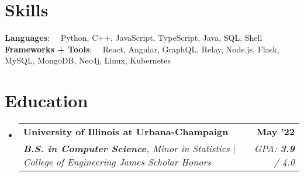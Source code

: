 \documentclass[letterpaper,11pt]{article}
\makeatletter
\newcommand{\resumeItem}[1]{
  \item\small{
    {#1 \vspace{-1pt}}
  }
}
\newcommand{\resumeSubheading}[4]{
  \vspace{-0pt}
  \item
    \begin{tabular*}{1\textwidth}[t]{l@{\extracolsep{\fill}}r}
      \large{\textbf{#1}} & \small{\color{main}\textbf{#2}} \\
      \textit{\small#3} & \textit{\small#4} \\
    \end{tabular*}\vspace{-7pt}
}
\newcommand{\resumeProjectHeading}[2]{
  \vspace{-0pt}
    \item
    \begin{tabular*}{1\textwidth}{l@{\extracolsep{\fill}}r}
      \small\textbf{#1} & \small{\color{main}\textbf{#2}} \\
    \end{tabular*}\vspace{-7pt}
}
\newcommand{\resumeSubHeadingListStart}{\begin{itemize}[leftmargin=0in, label={}]}
\newcommand{\resumeSubHeadingListEnd}{\end{itemize}}
\newcommand{\resumeItemListStart}{\begin{itemize}}
\newcommand{\resumeItemListEnd}{\end{itemize}\vspace{0pt}}
\makeatother
\begin{document}

\section{Skills}
\vspace{-4pt}
\begin{itemize}[leftmargin=0in, label={}]
  \small{\item{
        \textbf{\hspace{13.77mm}  Languages}{: \ \ Python, C++, JavaScript, TypeScript, Java, SQL, Shell} \\
        \textbf{Frameworks + Tools}{: \ \ React, Angular, GraphQL, Relay, Node.js, Flask, MySQL, MongoDB, Neo4j, Linux, Kubernetes}}}
\end{itemize}


\section{Education}
\vspace{-3pt}
\resumeSubHeadingListStart
\resumeSubheading
{University of Illinois at Urbana-Champaign}{May '22} %
{\textnormal{\textbf{B.S. in Computer Science}, Minor in Statistics $|$ College of Engineering James Scholar Honors}}
{\textnormal{GPA: \textbf{3.9} / 4.0}}
\resumeSubHeadingListEnd

\end{document}
